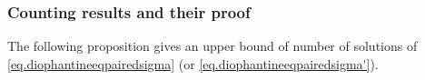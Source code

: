 











\subsubsection{Counting results and their proof}
The following proposition gives an upper bound of number of solutions of \eqref{eq.diophantineeqpairedsigma} (or \eqref{eq.diophantineeqpairedsigma'}).

